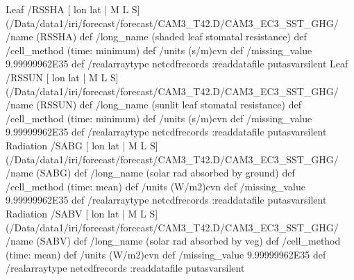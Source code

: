 \begin{ingrid}
Leaf /RSSHA{
[ lon lat | M L S] (/Data/data1/iri/forecast/forecast/CAM3_T42.D/CAM3_EC3_SST_GHG/%
/name (RSSHA) def
 /long_name (shaded leaf stomatal resistance) def
 /cell_method (time: minimum) def
 /units (s/m)cvn def
 /missing_value 9.99999962E35 def
 /realarraytype netcdfrecords :readdatafile
}putasvarsilent
Leaf /RSSUN{
[ lon lat | M L S] (/Data/data1/iri/forecast/forecast/CAM3_T42.D/CAM3_EC3_SST_GHG/%
/name (RSSUN) def
 /long_name (sunlit leaf stomatal resistance) def
 /cell_method (time: minimum) def
 /units (s/m)cvn def
 /missing_value 9.99999962E35 def
 /realarraytype netcdfrecords :readdatafile
}putasvarsilent
Radiation /SABG{
[ lon lat | M L S] (/Data/data1/iri/forecast/forecast/CAM3_T42.D/CAM3_EC3_SST_GHG/%
/name (SABG) def
 /long_name (solar rad absorbed by ground) def
 /cell_method (time: mean) def
 /units (W/m2)cvn def
 /missing_value 9.99999962E35 def
 /realarraytype netcdfrecords :readdatafile
}putasvarsilent
Radiation /SABV{
[ lon lat | M L S] (/Data/data1/iri/forecast/forecast/CAM3_T42.D/CAM3_EC3_SST_GHG/%
/name (SABV) def
 /long_name (solar rad absorbed by veg) def
 /cell_method (time: mean) def
 /units (W/m2)cvn def
 /missing_value 9.99999962E35 def
 /realarraytype netcdfrecords :readdatafile
}putasvarsilent


\end{ingrid}
